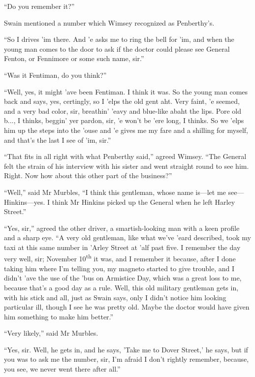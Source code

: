 \enquote{Do you remember it?}

Swain mentioned a number which Wimsey recognized as Penberthy's.

\enquote{So I drives 'im there. And 'e asks me to ring the bell for 'im, and when the young man comes to the door to ask if the doctor could please see General Fenton, or Fennimore or some such name, sir.}

\enquote{Was it Fentiman, do you think?}

\enquote{Well, yes, it might 'ave been Fentiman. I think it was. So the young man comes back and says, yes, certingly, so I 'elps the old gent aht. Very faint, 'e seemed, and a very bad color, sir, breathin' 'eavy and blue-like abaht the lips. Pore old b..., I thinks, beggin' yer pardon, sir, 'e won't be 'ere long, I thinks. So we 'elps him up the steps into the 'ouse and 'e gives me my fare and a shilling for myself, and that's the last I see of 'im, sir.}

\enquote{That fits in all right with what Penberthy said,} agreed Wimsey. \enquote{The General felt the strain of his interview with his sister and went straight round to see him. Right. Now how about this other part of the business?}

\enquote{Well,} said Mr Murbles, \enquote{I think this gentleman, whose name is\allowbreak---\allowbreak let me see\allowbreak---\allowbreak Hinkins---yes. I think Mr Hinkins picked up the General when he left Harley Street.}

\enquote{Yes, sir,} agreed the other driver, a smartish-looking man with a keen profile and a sharp eye. \enquote{A very old gentleman, like what we've 'eard described, took my taxi at this same number in 'Arley Street at 'alf past five. I remember the day very well, sir; November  10\textsuperscript{th} it was, and I remember it because, after I done taking him where I'm telling you, my magneto started to give trouble, and I didn't 'ave the use of the 'bus on Armistice Day, which was a great loss to me, because that's a good day as a rule. Well, this old military gentleman gets in, with his stick and all, just as Swain says, only I didn't notice him looking particular ill, though I see he was pretty old. Maybe the doctor would have given him something to make him better.}

\enquote{Very likely,} said Mr Murbles.

\enquote{Yes, sir. Well, he gets in, and he says, 'Take me to Dover Street,' he says, but if you was to ask me the number, sir, I'm afraid I don't rightly remember, because, you see, we never went there after all.}

